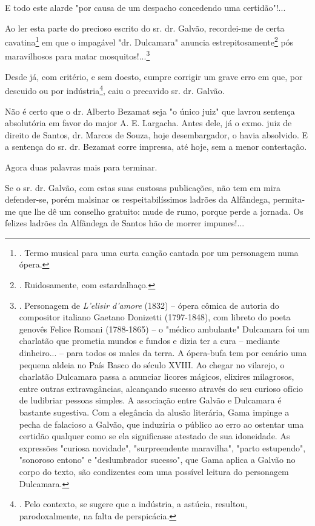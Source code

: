 E todo este alarde "por causa de um despacho concedendo uma
certidão"!...

Ao ler esta parte do precioso escrito do sr. dr. Galvão, recordei-me de
certa cavatina\footnote{. Termo musical para uma curta canção cantada
  por um personagem numa ópera.} em que o impagável "dr. Dulcamara"
anuncia estrepitosamente\footnote{. Ruidosamente, com estardalhaço.} pós
maravilhosos para matar mosquitos!...\footnote{. Personagem de
  \emph{L'elisir d'amore} (1832) -- ópera cômica de autoria do
  compositor italiano Gaetano Donizetti (1797-1848), com libreto do
  poeta genovês Felice Romani (1788-1865) -- o "médico ambulante"
  Dulcamara foi um charlatão que prometia mundos e fundos e dizia ter a
  cura -- mediante dinheiro... -- para todos os males da terra. A
  ópera-bufa tem por cenário uma pequena aldeia no País Basco do século
  XVIII. Ao chegar no vilarejo, o charlatão Dulcamara passa a anunciar
  licores mágicos, elixires milagrosos, entre outras extravagâncias,
  alcançando sucesso através do seu curioso ofício de ludibriar pessoas
  simples. A associação entre Galvão e Dulcamara é bastante sugestiva.
  Com a elegância da alusão literária, Gama impinge a pecha de falacioso
  a Galvão, que induziria o público ao erro ao ostentar uma certidão
  qualquer como se ela significasse atestado de sua idoneidade. As
  expressões "curiosa novidade", "surpreendente maravilha", "parto
  estupendo", "sonoroso entono" e "deslumbrador sucesso", que Gama
  aplica a Galvão no corpo do texto, são condizentes com uma possível
  leitura do personagem Dulcamara.}

Desde já, com critério, e sem doesto, cumpre corrigir um grave erro em
que, por descuido ou por indústria\footnote{. Pelo contexto, se sugere
  que a indústria, a astúcia, resultou, parodoxalmente, na falta de
  perspicácia.}, caiu o precavido sr. dr. Galvão.

Não é certo que o dr. Alberto Bezamat seja "o único juiz" que lavrou
sentença absolutória em favor do major A. E. Largacha. Antes dele, já o
exmo. juiz de direito de Santos, dr. Marcos de Souza, hoje
desembargador, o havia absolvido. E a sentença do sr. dr. Bezamat corre
impressa, até hoje, sem a menor contestação.

Agora duas palavras mais para terminar.

Se o sr. dr. Galvão, com estas suas custosas publicações, não tem em
mira defender-se, porém malsinar os respeitabilíssimos ladrões da
Alfândega, permita-me que lhe dê um conselho gratuito: mude de rumo,
porque perde a jornada. Os felizes ladrões da Alfândega de Santos hão de
morrer impunes!...

